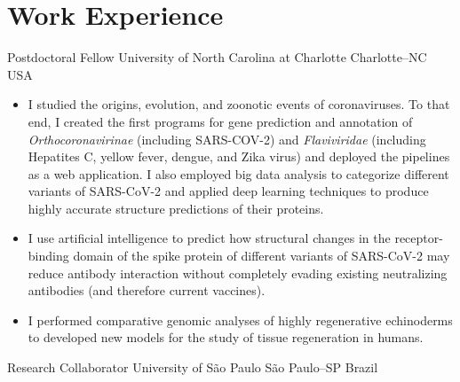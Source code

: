 \documentclass[11pt, letterpaper, sans]{moderncv}
\begin{document}

\vspace{-1.5em}

\section{Work Experience}
    	{Postdoctoral Fellow}
    	{University of North Carolina at Charlotte}
    	{Charlotte--NC}
    	{USA}
    	{}
    \vspace{-1em}
    \begin{itemize}[itemsep=-0.05in, labelindent=0in, leftmargin=1cm]\small
	    \item[\textcolor{color1}{\textbullet}] I studied the origins, evolution, and zoonotic events of coronaviruses. To that end, I created the first programs for gene prediction and annotation of \textit{Orthocoronavirinae} (including SARS-COV-2) and \textit{Flaviviridae} (including Hepatites C, yellow fever, dengue, and Zika virus) and deployed the pipelines as a web application. I also employed big data analysis to categorize different variants of SARS-CoV-2 and applied deep learning techniques to produce highly accurate structure predictions of their proteins.
	    \item[\textcolor{color1}{\textbullet}] I use artificial intelligence to predict how structural changes in the receptor-binding domain of the spike protein of different variants of SARS-CoV-2 may reduce antibody interaction without completely evading existing neutralizing antibodies (and therefore current vaccines).
	    \item[\textcolor{color1}{\textbullet}] I performed comparative genomic analyses of highly regenerative echinoderms to developed new models for the study of tissue regeneration in humans.
	\end{itemize}
    \vspace{-0.5em}
    	{Research Collaborator}
    	{University of São Paulo}
    	{São Paulo--SP}
    	{Brazil}
    	{}
    \vspace{-1em}
\end{document}
